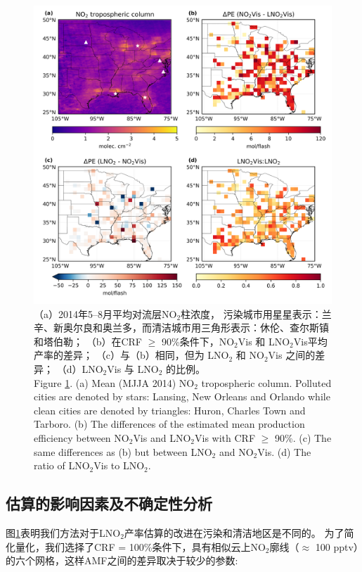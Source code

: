 \begin{figure}[!htbp]
\centering
\includegraphics[width=13cm]{./figures/us_delta.png}
\caption{（a）2014年5--8月平均对流层NO$_2$柱浓度，
污染城市用星星表示：兰辛、新奥尔良和奥兰多，而清洁城市用三角形表示：休伦、查尔斯镇和塔伯勒；
（b）在CRF $\geq$ 90\%条件下，NO$_2$Vis 和 LNO$_2$Vis平均产率的差异；
（c）与（b）相同，但为 LNO$_2$ 和 NO$_2$Vis 之间的差异；
（d）LNO$_2$Vis 与 LNO$_2$ 的比例。\\
Figure \ref{fig:us_delta}.
(a) Mean (MJJA 2014) NO$_2$ tropospheric column.
Polluted cities are denoted by stars: Lansing, New Orleans and Orlando while clean cities are denoted by triangles: Huron, Charles Town and Tarboro.
(b) The differences of the estimated mean production efficiency between NO$_2$Vis and LNO$_2$Vis with CRF $\geq$ 90\%.
(c) The same differences as (b) but between LNO$_2$ and NO$_2$Vis.
(d) The ratio of LNO$_2$Vis to LNO$_2$.
}
\label{fig:us_delta}
\end{figure}
\FloatBarrier

\subsection{估算的影响因素及不确定性分析} \label{sec:uncertainty}

图\ref{fig:us_delta}表明我们方法对于LNO$_2$产率估算的改进在污染和清洁地区是不同的。
为了简化量化，我们选择了CRF = 100\%条件下，具有相似云上NO$_2$廓线（$\approx$ 100 pptv）的六个网格，这样AMF之间的差异取决于较少的参数:

